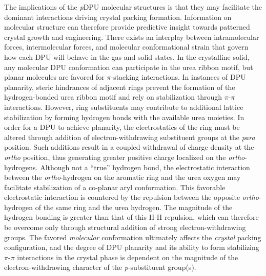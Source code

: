 The implications of the \textit{p}DPU molecular structures is that they may facilitate the dominant interactions driving crystal packing formation. Information on molecular structure can therefore provide predictive insight towards patterned crystal growth and engineering. There exists an interplay between intramolecular forces, intermolecular forces, and molecular conformational strain that govern how each DPU will behave in the gas and solid states. In the crystalline solid, any molecular DPU conformation can participate in the urea ribbon motif, but planar molecules are favored for $\pi$-stacking interactions. In instances of DPU planarity, steric hindrances of adjacent rings prevent the formation of the hydrogen-bonded urea ribbon motif and rely on stabilization through $\pi$-$\pi$ interactions. However, ring substituents may contribute to additional lattice stabilization by forming hydrogen bonds with the available urea moieties. In order for a DPU to achieve planarity, the electrostatics of the ring must be altered through addition of electron-withdrawing substituent groups at the \textit{para} position. Such additions result in a coupled withdrawal of charge density at the \textit{ortho} position, thus generating greater positive charge localized on the \textit{ortho}-hydrogens. Although not a ``true'' hydrogen bond, the electrostatic interaction between the \textit{ortho}-hydrogen on the aromatic ring and the urea oxygen may facilitate stabilization of a co-planar aryl conformation. This favorable electrostatic interaction is countered by the repulsion between the opposite \textit{ortho}-hydrogen of the same ring and the urea hydrogen. The magnitude of the hydrogen bonding is greater than that of this H-H repulsion, which can therefore be overcome only through structural addition of strong electron-withdrawing groups. The favored \textit{molecular} conformation ultimately affects the \textit{crystal} packing configuration, and the degree of DPU planarity and its ability to form stabilizing $\pi$-$\pi$ interactions in the crystal phase is dependent on the magnitude of the electron-withdrawing character of the \textit{p}-substituent group(s).

